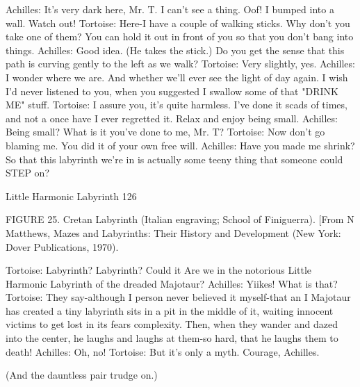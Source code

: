                Achilles: It's very dark here, Mr. T. I can't see a thing. Oof! I bumped
                      into a wall. Watch out!
               Tortoise: Here-I have a couple of walking sticks. Why don't you take one
                      of them? You can hold it out in front of you so that you don't
                      bang into things.
               Achilles: Good idea. (He takes the stick.) Do you get the sense that this
                      path is curving gently to the left as we walk? Tortoise: Very
                      slightly, yes.
               Achilles: I wonder where we are. And whether we'll ever see the light of
                      day again. I wish I'd never listened to you, when you suggested I
                      swallow some of that "DRINK ME" stuff.
               Tortoise: I assure you, it's quite harmless. I've done it scads of times, and
                      not a once have I ever regretted it. Relax and enjoy being small.
               Achilles: Being small? What is it you've done to me, Mr. T?
               Tortoise: Now don't go blaming me. You did it of your own free will.
                      Achilles: Have you made me shrink? So that this labyrinth we're
                      in is actually some teeny thing that someone could STEP on?




Little Harmonic Labyrinth                                                               126

               FIGURE 25. Cretan Labyrinth (Italian engraving; School of
                    Finiguerra). [From N Matthews, Mazes and Labyrinths: Their
                    History and Development (New York: Dover Publications, 1970).

               Tortoise: Labyrinth? Labyrinth? Could it Are we in the notorious Little
                      Harmonic Labyrinth of the dreaded Majotaur?
               Achilles: Yiikes! What is that?
               Tortoise: They say-although I person never believed it myself-that an I
                      Majotaur has created a tiny labyrinth sits in a pit in the middle of
                      it, waiting innocent victims to get lost in its fears complexity.
                      Then, when they wander and dazed into the center, he laughs and
                      laughs at them-so hard, that he laughs them to death!
               Achilles: Oh, no!
               Tortoise: But it's only a myth. Courage, Achilles.

                      (And the dauntless pair trudge on.)

